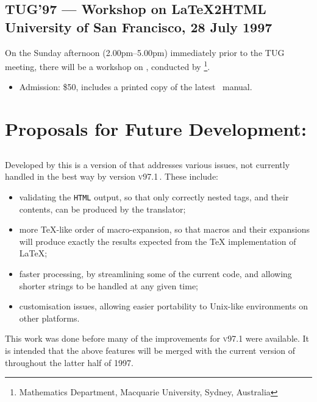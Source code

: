 \vfil

\subsection*[center]{TUG'97 --- Workshop on \LaTeX2HTML\\
University of San Francisco, 28 July 1997\label{tug97}}

\noindent
On the Sunday afternoon (2.00pm--5.00pm)
immediately prior to the TUG meeting, there will be a workshop
on \latextohtml, conducted by \RossMoore\footnote{%
Mathematics Department, Macquarie University, Sydney, Australia}.

\begin{itemize}
\item[]
Admission: \$50, includes a printed copy of the latest \latextohtml\ manual.

\end{itemize}

\vfil


\clearpage
\section*{Proposals for Future Development:\label{future}}%


\subsection*{\latextohtmlNG}
Developed by \Hennecke\label{latex2htmlNG} this is a version of 
\latextohtml{} that addresses various issues,
not currently handled in the best way by version \textsc{v97.1}\,.
These include:
\begin{itemize}
\item validating the \texttt{HTML} output,
so that only correctly nested tags, and their contents,
can be produced by the translator;
%
\item more \TeX-like order of macro-expansion,
so that macros and their expansions will produce exactly
the results expected from the \TeX{} implementation of \LaTeX;
%
\item faster processing,
by streamlining some of the current \Perl{} code, and allowing
shorter strings to be handled at any given time;
%
\item customisation issues,
allowing easier portability to Unix-like environments on
other platforms.
%
\end{itemize}
This work was done before many of the improvements for \textsc{v97.1}
were available. It is intended that the above features will
be merged with the current version of \latextohtml{} throughout
the latter half of 1997.

